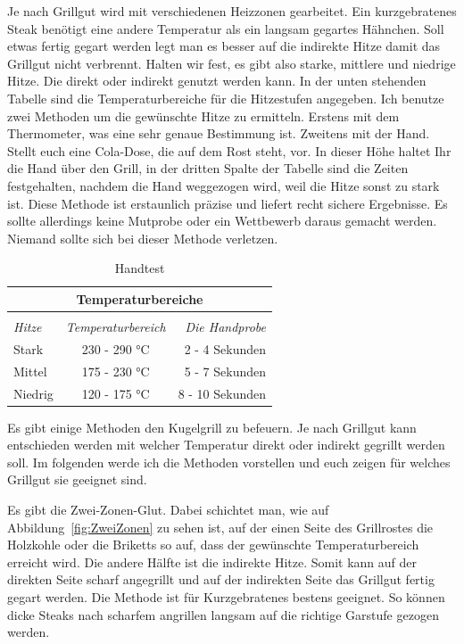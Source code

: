 	Je nach Grillgut wird mit verschiedenen Heizzonen gearbeitet. Ein 
	kurzgebratenes Steak benötigt eine 
	andere Temperatur als ein langsam gegartes Hähnchen. Soll etwas fertig 
	gegart werden legt man es 
	besser auf die indirekte Hitze damit das Grillgut nicht verbrennt. Halten wir 
	fest, es gibt also starke, 
	mittlere und niedrige Hitze. Die direkt oder indirekt genutzt werden kann. In der 
	unten stehenden Tabelle 
	sind die Temperaturbereiche für die Hitzestufen angegeben. Ich benutze zwei 
	Methoden um die 
	gewünschte Hitze zu ermitteln. Erstens mit dem Thermometer, was eine sehr 
	genaue Bestimmung ist. 
	Zweitens mit der Hand. Stellt euch eine Cola-Dose, die auf dem Rost steht, vor. 
	In dieser Höhe haltet Ihr 
	die Hand über den Grill, in der dritten Spalte der Tabelle sind die Zeiten 
	festgehalten, nachdem die Hand 
	weggezogen wird,  weil die Hitze sonst zu stark ist. Diese Methode ist 
	erstaunlich präzise und liefert 
	recht sichere Ergebnisse.  Es sollte allerdings keine Mutprobe oder ein 
	Wettbewerb daraus gemacht werden.
	Niemand sollte sich bei dieser Methode verletzen.
\newline
 
\begin{table}[htpb]
\centering
\caption{Handtest}
\label{tab:Handtest}
\begin{tabular}{lcr}
		\multicolumn{3}{c}{\textbf{Temperaturbereiche}}		\\
\hline										\\
\emph{Hitze}		&\emph{Temperaturbereich}		& \emph{Die Handprobe}	\\
Stark				& 230 - 290 °C					& 2 - 4 Sekunden	\\
Mittel              & 175 - 230 °C					& 5 - 7 Sekunden	\\
Niedrig				& 120 - 175 °C					& 8 - 10 Sekunden	\\
\end{tabular}
\end{table}

	Es gibt einige Methoden den Kugelgrill zu befeuern. Je nach Grillgut kann 
	entschieden werden mit welcher 
	Temperatur direkt oder indirekt gegrillt werden soll. Im folgenden werde ich die 
	Methoden vorstellen und euch
	zeigen für welches Grillgut sie geeignet sind.
	
	Es gibt die Zwei-Zonen-Glut. Dabei schichtet man, wie auf 
	Abbildung~\vref{fig:ZweiZonen} zu sehen ist, auf 
	der einen Seite des Grillrostes die Holzkohle oder die Briketts so auf, dass der 
	gewünschte Temperaturbereich 
	erreicht wird. Die andere Hälfte ist die indirekte Hitze. Somit kann auf der 
	direkten Seite scharf angegrillt und 
	auf der indirekten Seite das Grillgut fertig gegart werden. Die Methode ist für 
	Kurzgebratenes bestens 
	geeignet. So können dicke Steaks nach scharfem angrillen langsam auf die 
	richtige Garstufe gezogen werden.

